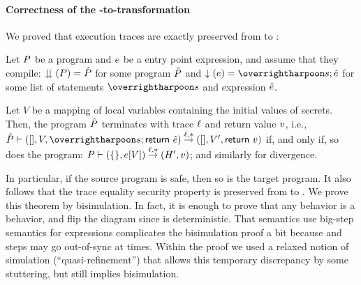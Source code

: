 \paragraph{Correctness of the \lamstar-to-\cstar transformation}

We proved that execution traces are exactly preserved from
\lamstar to \cstar:

\begin{lemma} \label{lem:lamstar-to-cstar}
 Let $P$ be a \lamstar program and $e$ be a \lamstar entry point
 expression, and assume that they compile: $\downdownarrows (P) = \hat{P}$ for
 some \cstar program $\hat{P}$ and $\lowtoc(\lexp) = \ls{\cstmt}; \cexp$
 for some \cstar list of statements $\ls{\cstmt}$ and expression
 $\hat{e}$.
 
 Let $V$ be a mapping of local variables containing the initial values
 of secrets. Then, the \cstar program $\hat{P}$ terminates with trace
 $\ell$ and return value $v$, i.e., $\cp \vdash ([], V,
 \ls{\cstmt}; \kw{return} ~ \cexp) \stackrel{\trace,\ast}{\rightarrow}
 ([], V', \kw{return} ~ \lv)$ if, and only if, so does the \lamstar
 program: $P \vdash (\{\}, e[V])
 \stackrel{\ell,\ast}{\rightarrow} (H', v)$; and similarly for
 divergence.
\end{lemma}

In particular, if the source \lamstar program is safe, then so is the
target \cstar program. It also follows that the trace equality
security property is preserved from \lamstar to \cstar.
%
We prove this theorem by bisimulation. In fact, it is enough to prove
that any \lamstar behavior is a \cstar behavior, and flip the diagram
since \cstar is deterministic. That \cstar semantics use
big-step semantics for \cstar expressions complicates the bisimulation
proof a bit because \lamstar and \cstar steps may go out-of-sync at
times. Within the proof we used a relaxed notion of simulation
(``quasi-refinement'') that allows this temporary discrepancy by some
stuttering, but still implies bisimulation.
